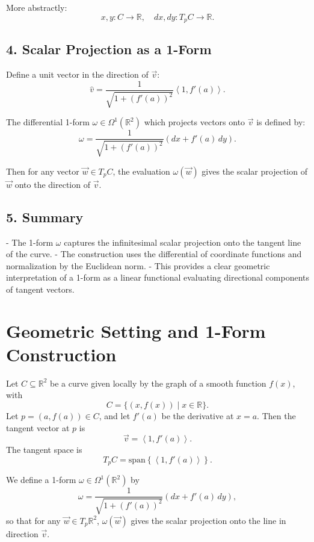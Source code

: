 \documentclass[12pt]{article}
\begin{document}
	More abstractly:
	\[
	x, y : C \to \mathbb{R}, \quad dx, dy: T_p C \to \mathbb{R}.
	\]
	
	\subsection*{4. Scalar Projection as a 1-Form}
	
	Define a unit vector in the direction of \( \vec{v} \):
	\[
	\hat{v} = \frac{1}{\sqrt{1 + (f'(a))^2}} \left\langle 1, f'(a) \right\rangle.
	\]
	
	The differential 1-form \( \omega \in \Omega^1(\mathbb{R}^2) \) which projects vectors onto \( \vec{v} \) is defined by:
	\[
	\omega = \frac{1}{\sqrt{1 + (f'(a))^2}} \left( dx + f'(a) \, dy \right).
	\]
	
	Then for any vector \( \vec{w} \in T_p C \), the evaluation \( \omega(\vec{w}) \) gives the scalar projection of \( \vec{w} \) onto the direction of \( \vec{v} \).
	
	\subsection*{5. Summary}
	
	- The 1-form \( \omega \) captures the infinitesimal scalar projection onto the tangent line of the curve.
	- The construction uses the differential of coordinate functions and normalization by the Euclidean norm.
	- This provides a clear geometric interpretation of a 1-form as a linear functional evaluating directional components of tangent vectors.
	
	\newpage
	\section*{Geometric Setting and 1-Form Construction}
	
	Let \( C \subseteq \mathbb{R}^2 \) be a curve given locally by the graph of a smooth function \( f(x) \), with
	\[
	C = \{ (x, f(x)) \mid x \in \mathbb{R} \}.
	\]
	Let \( p = (a, f(a)) \in C \), and let \( f'(a) \) be the derivative at \( x = a \). Then the tangent vector at \( p \) is
	\[
	\vec{v} = \left\langle 1, f'(a) \right\rangle.
	\]
	The tangent space is
	\[
	T_pC = \text{span}\left\{ \left\langle 1, f'(a) \right\rangle \right\}.
	\]
	
	We define a 1-form \( \omega \in \Omega^1(\mathbb{R}^2) \) by
	\[
	\omega = \frac{1}{\sqrt{1 + (f'(a))^2}} \left( dx + f'(a) \, dy \right),
	\]
	so that for any \( \vec{w} \in T_p \mathbb{R}^2 \), \( \omega(\vec{w}) \) gives the scalar projection onto the line in direction \( \vec{v} \).
	
\end{document}
